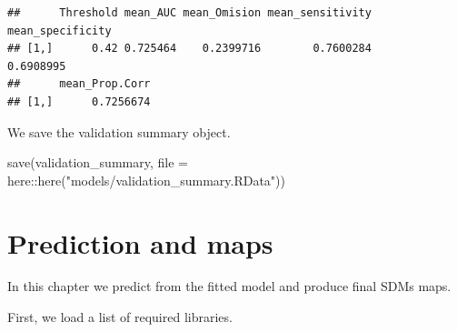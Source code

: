 \documentclass[
]{book}
\newenvironment{Shaded}{\begin{snugshade}}{\end{snugshade}}
\newcommand{\AttributeTok}[1]{\textcolor[rgb]{0.77,0.63,0.00}{#1}}
\newcommand{\CommentTok}[1]{\textcolor[rgb]{0.56,0.35,0.01}{\textit{#1}}}
\newcommand{\FunctionTok}[1]{\textcolor[rgb]{0.00,0.00,0.00}{#1}}
\newcommand{\NormalTok}[1]{#1}
\newcommand{\OtherTok}[1]{\textcolor[rgb]{0.56,0.35,0.01}{#1}}
\newcommand{\SpecialCharTok}[1]{\textcolor[rgb]{0.00,0.00,0.00}{#1}}
\newcommand{\StringTok}[1]{\textcolor[rgb]{0.31,0.60,0.02}{#1}}
\begin{document}
\begin{Shaded}
\end{Shaded}

\begin{verbatim}
##      Threshold mean_AUC mean_Omision mean_sensitivity mean_specificity
## [1,]      0.42 0.725464    0.2399716        0.7600284        0.6908995
##      mean_Prop.Corr
## [1,]      0.7256674
\end{verbatim}

We save the validation summary object.

\begin{Shaded}
\begin{Highlighting}[]
\FunctionTok{save}\NormalTok{(validation\_summary, }\AttributeTok{file =}\NormalTok{ here}\SpecialCharTok{::}\FunctionTok{here}\NormalTok{(}\StringTok{"models/validation\_summary.RData"}\NormalTok{))}
\end{Highlighting}
\end{Shaded}

\hypertarget{prediction-and-maps}{%
\chapter{Prediction and maps}\label{prediction-and-maps}}

In this chapter we predict from the fitted model and produce final SDMs maps.

First, we load a list of required libraries.
\end{document}
